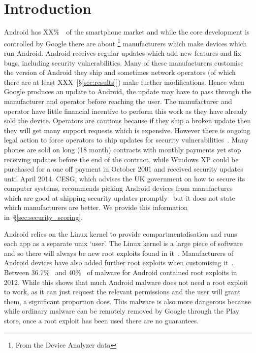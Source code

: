 \documentclass[conference,a4paper,twoside]{IEEEtran}
\newcommand{\percMarketShare}{XX\%~\cite{TODO}}
\newcommand{\daNumNetworkOperators}{XXX~[\S\ref{sec:results}]}
\begin{document}
\section{Introduction}
Android has \percMarketShare\ of the smartphone market and while the core development is controlled by Google there are about \daNumManufacturers\footnote{From the Device Analyzer data} manufacturers which make devices which run Android.
Android receives regular updates  which add new features and fix bugs, including security vulnerabilities.
Many of these manufacturers customise the version of Android they ship and sometimes network operators (of which there are at least \daNumNetworkOperators) make further modifications.
Hence when Google produces an update to Android, the update may have to pass through the manufacturer and operator before reaching the user.
The manufacturer and operator have little financial incentive to perform this work as they have already sold the device.
Operators are cautious because if they ship a broken update then they will get many support requests which is expensive.
However there is ongoing legal action to force operators to ship updates for security vulnerabilities~\cite{Soghoian2013}.
Many phones are sold on long (18 month) contracts with monthly payments yet stop receiving updates before the end of the contract, while Windows XP could be purchased for a one off payment in October 2001 and received security updates until April 2014.
CESG, which advises the UK government on how to secure its computer systems, recommends picking Android devices from manufactures which are good at shipping security updates promptly~\cite{CESG2013} but it does not state which manufacturers are better.
We provide this information in~\S\ref{sec:security_scoring}.

Android relies on the Linux kernel to provide compartmentalisation and runs each app as a separate unix `user'.
The Linux kernel is a large piece of software and so there will always be new root exploits found in it~\cite{TODO}.
Manufacturers of Android devices have also added further root exploits when customising it~\cite{Grace2012}.
Between 36.7\%~\cite{Zhou2012b} and 40\%~\cite{Zhou2012a} of malware for Android contained root exploits in 2012.
While this shows that much Android malware does not need a root exploit to work, as it can just request the relevant permissions and the user will grant them, a significant proportion does.
This malware is also more dangerous because while ordinary malware can be remotely removed by Google through the Play store, once a root exploit has been used there are no guarantees.
\end{document}
